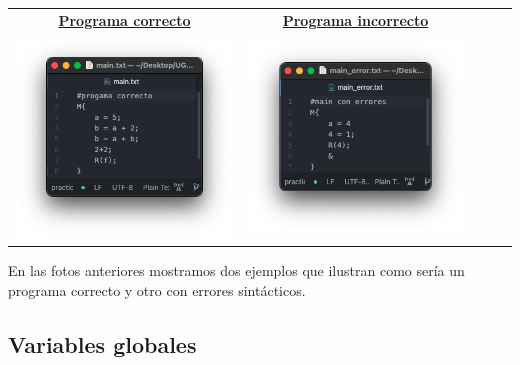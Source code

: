 \begin{table}[H]
	\centering
	\begin{tabular}{lllll}
		\multicolumn{1}{c}{\underline{\textbf{Programa correcto}}} & \multicolumn{1}{c}{\underline{\textbf{Programa incorrecto}}} \\
		\multicolumn{1}{c}{\includegraphics[scale=0.5]{../practica_2/images/programa_correcto.png}} & \multicolumn{1}{c}{\includegraphics[scale=0.5]{../practica_2/images/programa_err.png}}
	\end{tabular}
\end{table}

En las fotos anteriores mostramos dos ejemplos que ilustran como sería un programa correcto y otro con errores sintácticos.

\subsection{Variables globales}

